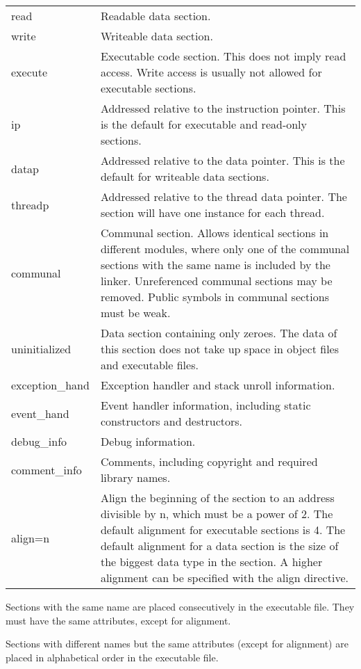 \documentclass[forwardcom.tex]{subfiles}
\begin{document}
\begin{tabular}{|p{28mm}p{130mm}|}
\hline
read & Readable data section. \\
write & Writeable data section. \\
execute & Executable code section. This does not imply read access. Write access is usually not allowed for executable sections. \\
ip & Addressed relative to the instruction pointer. This is the default for executable and read-only sections. \\
datap & Addressed relative to the data pointer. This is the default for writeable data sections. \\
threadp & Addressed relative to the thread data pointer. The section will have one instance for each thread. \\
communal \label{communal} & Communal section. Allows identical sections in different modules, where only one of the
communal sections with the same name is included by the linker. 
Unreferenced communal sections may be removed.
Public symbols in communal sections must be weak. \\
uninitialized & Data section containing only zeroes. The data of this section does not take up space in object files and executable files.\\
exception\_hand & Exception handler and stack unroll information.\\
event\_hand & Event handler information, including static constructors and destructors.\\
debug\_info & Debug information.\\
comment\_info & Comments, including copyright and required library names.\\
align=n & Align the beginning of the section to an address divisible by n, which must be a power of 2.
The default alignment for executable sections is 4. The default alignment for a data section is the size of the biggest data type in the section. A higher alignment can be specified with the align directive.\\
\hline
\end{tabular}
\vv

Sections with the same name are placed consecutively in the executable file. They must have the same attributes, except for alignment.
\vv

Sections with different names but the same attributes (except for alignment) are placed in alphabetical order in the executable file.
\vv
\end{document}
